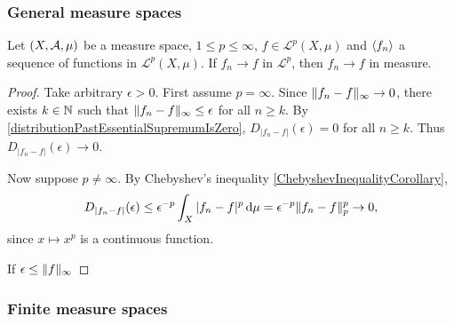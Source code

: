 \subsubsection{General measure spaces}
\begin{proposition}
Let $\sSet{X,\mathcal{A},\mu}$ be a measure space, $1 \leq p \leq \infty$, $f\in \mathcal{L}^p(X,\mu)$ and $\left\langle f_n \right\rangle$ a sequence of functions in $\mathcal{L}^p(X,\mu)$. If $f_n\to f$ in $\mathcal{L}^p$, then $f_n \to f$ in measure.
\end{proposition}
\begin{proof}
Take arbitrary $\epsilon > 0$.
First assume $p = \infty$. Since $\lVert f_n - f\rVert_\infty \to 0$, there exists $k\in\mathbb{N}$ such that $\lVert f_n - f\rVert_\infty \leq \epsilon$ for all $n\geq k$. By \ref{distributionPastEssentialSupremumIsZero}, $D_{|f_n - f|}(\epsilon) = 0$ for all $n\geq k$. Thus $D_{|f_n - f|}(\epsilon) \to 0$.

Now suppose $p \neq \infty$.
By Chebyshev's inequality \ref{ChebyshevInequalityCorollary},
\[ D_{|f_n - f|}(\epsilon) \leq \epsilon^{-p}\int_X |f_n - f|^p\operatorname{d \!}{\mu} = \epsilon^{-p}\lVert f_n - f\rVert_p^p \to 0, \]
since $x\mapsto x^p$ is a continuous function.

If $\epsilon \leq \lVert f\rVert_\infty$
\end{proof}

\subsubsection{Finite measure spaces}

